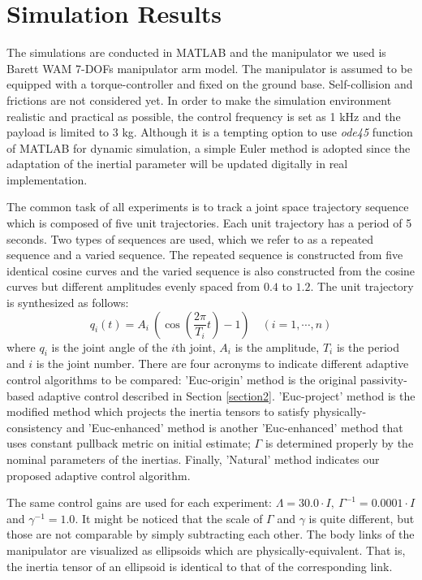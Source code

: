 \documentclass[letterpaper, 10 pt, conference]{ieeeconf}  %
\begin{document}
\section{Simulation Results}
The simulations are conducted in MATLAB and the manipulator we used is Barett WAM 7-DOFs manipulator arm model. The manipulator is assumed to be equipped with a torque-controller and fixed on the ground base. Self-collision and frictions are not considered yet. In order to make the simulation environment realistic and practical as possible, the control frequency is set as 1 kHz and the payload is limited to 3 kg. Although it is a tempting option to use {\it{ode45}} function of MATLAB for dynamic simulation, a simple Euler method is adopted since the adaptation of the inertial parameter will be updated digitally in real implementation.

The common task of all experiments is to track a joint space trajectory sequence which is composed of five unit trajectories. Each unit trajectory has a period of 5 seconds. Two types of sequences are used, which we refer to as a repeated sequence and a varied sequence. The repeated sequence is constructed from five identical cosine curves and the varied sequence is also constructed from the cosine curves but different amplitudes evenly spaced from $0.4$ to $1.2$. The unit trajectory is synthesized as follows:
\begin{equation*}
	q_i(t) = A_i~(\cos(\frac{2\pi}{T_i}t)-1)  \quad (i=1,\cdots,n)
\end{equation*}
where $q_i$ is the joint angle of the $i$th joint, $A_i$ is the amplitude,  $T_i$ is the period and $i$ is the joint number. There are four acronyms to indicate different adaptive control algorithms to be compared: 'Euc-origin' method is the original passivity-based adaptive control described in Section \ref{section2}. 'Euc-project' method is the modified method which projects the inertia tensors to satisfy physically-consistency and 'Euc-enhanced' method is another 'Euc-enhanced' method that uses constant pullback metric on initial estimate; $\Gamma$ is determined properly by the nominal parameters of the inertias. Finally, 'Natural' method indicates our proposed adaptive control algorithm. 

The same control gains are used for each experiment:  $\Lambda = 30.0\cdot I, ~\Gamma^{-1} = 0.0001\cdot I$ and $\gamma^{-1} = 1.0$. It might be noticed that the scale of $\Gamma$ and $\gamma$ is quite different, but those are not comparable by simply subtracting each other. The body links of the manipulator are visualized as ellipsoids which are physically-equivalent. That is, the inertia tensor of an ellipsoid is identical to that of the corresponding link. 
\end{document}
